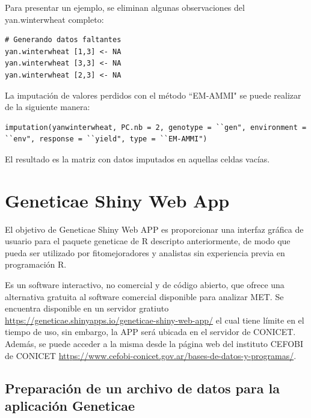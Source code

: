 Para presentar un ejemplo, se eliminan algunas observaciones del yan.winterwheat completo:

\begin{tcolorbox}[skin=bicolor,
    colframe=aurometalsaurus,colback=backcolour,colbacklower=white,
    width=1\linewidth,
    height=0.15\linewidth,
    boxsep=-3mm]
\begin{lstlisting}
# Generando datos faltantes
yan.winterwheat [1,3] <- NA
yan.winterwheat [3,3] <- NA
yan.winterwheat [2,3] <- NA
\end{lstlisting}
\end{tcolorbox}

La imputación de valores perdidos con el método ``EM-AMMI" se puede realizar de la siguiente manera:

\begin{tcolorbox}[skin=bicolor,
    colframe=aurometalsaurus,colback=backcolour,colbacklower=white,
    width=1\linewidth,
    height=0.1\linewidth,
    boxsep=-3mm]
\begin{lstlisting}
imputation(yanwinterwheat, PC.nb = 2, genotype = ``gen", environment = ``env", response = ``yield", type = ``EM-AMMI")
\end{lstlisting}
\end{tcolorbox}

El resultado es la matriz con datos imputados en aquellas celdas vacías. 


\section{Geneticae Shiny Web App}

El objetivo de Geneticae Shiny Web APP es proporcionar una interfaz gráfica de usuario para el paquete geneticae de R descripto anteriormente, de modo que pueda ser utilizado por fitomejoradores y analistas sin experiencia previa en programación R. 

Es un software interactivo, no comercial y de código abierto, que ofrece una alternativa gratuita al software comercial disponible para analizar MET. Se encuentra disponible en un servidor gratiuto \url{https://geneticae.shinyapps.io/geneticae-shiny-web-app/} el cual tiene límite en el tiempo de uso, sin embargo, la APP será ubicada en el servidor de CONICET. Además, se puede acceder a la misma desde la página web del instituto CEFOBI de CONICET \url{https://www.cefobi-conicet.gov.ar/bases-de-datos-y-programas/}.



\subsection{Preparación de un archivo de datos para la aplicación Geneticae}

